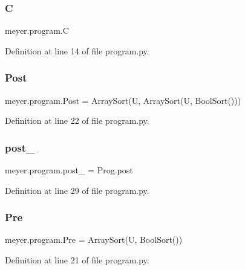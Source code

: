 \subsubsection{\texorpdfstring{C}{C}}
{\footnotesize\ttfamily meyer.\+program.\+C}



Definition at line 14 of file program.\+py.

\mbox{\label{namespacemeyer_1_1program_a18877460818246ee839f29d7e6dc5eed}} 
\subsubsection{\texorpdfstring{Post}{Post}}
{\footnotesize\ttfamily meyer.\+program.\+Post = Array\+Sort(U, Array\+Sort(U, Bool\+Sort()))}



Definition at line 22 of file program.\+py.

\mbox{\label{namespacemeyer_1_1program_a3222d9981c3064528ea694bbadf9c67a}} 
\subsubsection{\texorpdfstring{post\+\_\+}{post\_}}
{\footnotesize\ttfamily meyer.\+program.\+post\+\_\+ = Prog.\+post}



Definition at line 29 of file program.\+py.

\mbox{\label{namespacemeyer_1_1program_a18582ffc9743be82070d174cf1dd0def}} 
\subsubsection{\texorpdfstring{Pre}{Pre}}
{\footnotesize\ttfamily meyer.\+program.\+Pre = Array\+Sort(U, Bool\+Sort())}



Definition at line 21 of file program.\+py.

\mbox{\label{namespacemeyer_1_1program_a6f2f5087d48ccd14f64219bc08379388}} 
